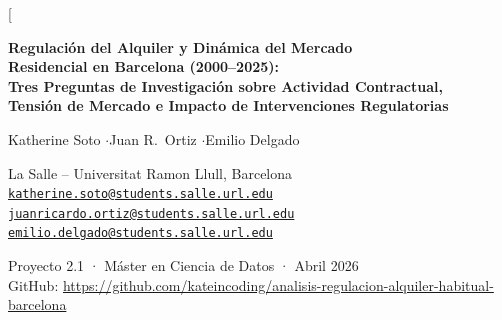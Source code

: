 \documentclass[10pt,a4paper,twocolumn]{article}
\begin{document}

\twocolumn[{%
\begin{@twocolumnfalse}
\begin{center}
  {\LARGE\bfseries
   Regulación del Alquiler y Dinámica del Mercado\\[4pt]
   Residencial en Barcelona (2000--2025):\\[4pt]
   Tres Preguntas de Investigación sobre Actividad Contractual,\\[4pt]
   Tensión de Mercado e Impacto de Intervenciones Regulatorias}

  \vspace{8pt}
  {\large Katherine Soto \quad$\cdot$\quad Juan R.\ Ortiz \quad$\cdot$\quad Emilio Delgado}

  \vspace{3pt}
  {\normalsize La Salle -- Universitat Ramon Llull, Barcelona}\\[2pt]
  {\small \href{mailto:katherine.soto@students.salle.url.edu}{\texttt{katherine.soto@students.salle.url.edu}} \quad
          \href{mailto:juanricardo.ortiz@students.salle.url.edu}{\texttt{juanricardo.ortiz@students.salle.url.edu}} \quad
          \href{mailto:emilio.delgado@students.salle.url.edu}{\texttt{emilio.delgado@students.salle.url.edu}}}

  \vspace{3pt}
  {\small Proyecto 2.1  · Máster en Ciencia de Datos · Abril 2026}\\
  {\small GitHub: \url{https://github.com/kateincoding/analisis-regulacion-alquiler-habitual-barcelona}}
\end{center}

\vspace{6pt}

\begin{abstract}
\noindent
Analizamos el mercado de alquiler habitual en Barcelona a lo largo de tres ciclos
regulatorios sucesivos (Ley~11/2020, derogación del Tribunal Constitucional en 2022
y Ley~12/2023) con datos trimestrales de Incasol -- Generalitat de Catalunya
(10 distritos, 2000Q1--2025Q3; 66 barrios, 2014Q1--2025Q3), IPC del INE (base~2025)
y Euríbor del Banco de España. El análisis se organiza en torno a tres preguntas:
cómo se asocia la regulación con la actividad contractual, dónde y cuándo emerge
la tensión de mercado, y qué impacto tienen las intervenciones sobre precio y volumen.
Para responderlas empleamos regresión de panel con efectos fijos ($N{=}2.838$),
clasificación supervisada con ingeniería de características por retardos temporales
y panel logit, y modelos SARIMAX$(1,1,1)(1,0,1)_4$ con análisis de intervención ITS-3.
Con lag features el AUC del Random Forest sube de 0.553 a 0.684. El ITS-3 muestra
que la Ley~12/2023 contrae los contratos de alquiler habitual y eleva el precio real,
consistente con un efecto composición por retirada selectiva de oferta. El análisis
de sustitución sitúa la tasa crítica de migración a temporada en el 20.3\,\%.
\end{abstract}


\end{@twocolumnfalse}}
\end{document}

